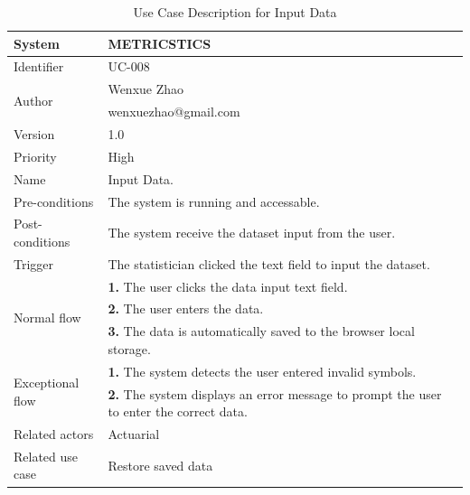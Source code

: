 \begin{table}[htb]
    \centering
    \begin{tabular}{|p{4cm}|p{12cm}|} \hline 
         System &  METRICSTICS\\ \hline 
         
         Identifier & UC-008 \\ \hline 
         
         \multirow{2}{*}{Author} & Wenxue Zhao   \\
         &wenxuezhao@gmail.com \\
           \hline 
           Version & 1.0\\ \hline
         
         Priority &  High\\ \hline 
         
         Name & Input Data. \\ \hline 
         Pre-conditions & The system is running and accessable. \\ \hline 
         Post-conditions & The system receive the dataset input from the user.  \\ \hline
         Trigger & The statistician clicked the text field to input the dataset. \\ \hline
        \multirow{3}{*}{Normal flow} 
        & \textbf{1.} The user clicks the data input text field. \\ 
        & \textbf{2.} The user enters the data.   \\ 
 & \textbf{3.}  The data is automatically saved to the browser local storage. \\ 
         
        
        \hline
        \multirow{2}{*}{Exceptional flow} 
        & \textbf{1.} The system detects the user entered invalid symbols. \\ 
        & \textbf{2.} The system displays an error message to prompt the user to enter the correct data.   \\  \hline 
        Related actors & Actuarial \\ \hline
        Related use case & Restore saved data  \\ \hline
    \end{tabular}
    \caption{Use Case Description for Input Data}
    \label{tab:my_label}
    \end{table}   
